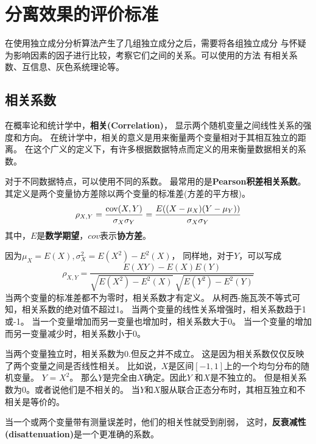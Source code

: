 ﻿%

\chapter{分离效果的评价标准}

\label{chap03}

在使用独立成分分析算法产生了几组独立成分之后，需要将各组独立成分
与怀疑为影响因素的因子进行比较，考察它们之间的关系。可以使用的方法
有相关系数、互信息、灰色系统理论等。
 
\section{相关系数}
在概率论和统计学中，\textbf{相关(Correlation)}，
显示两个随机变量之间线性关系的强度和方向。
在统计学中，相关的意义是用来衡量两个变量相对于其相互独立的距离。
在这个广义的定义下，有许多根据数据特点而定义的用来衡量数据相关的系数。

对于不同数据特点，可以使用不同的系数。
最常用的是\textbf{Pearson积差相关系数}。
其定义是两个变量协方差除以两个变量的标准差(方差的平方根)。
\begin{equation}
\rho_{X,Y} = {\mathrm{cov}(X,Y) \over \sigma_X \sigma_Y} 
           = {E((X-\mu_X)(Y-\mu_Y)) \over \sigma_X\sigma_Y}
\end{equation}
其中，$E$是\textbf{数学期望}，$cov$表示\textbf{协方差}。

因为$\mu_X = E(X), \sigma_X^2 = E(X^2) - E^2(X)$，
同样地，对于$Y$，可以写成
\begin{equation}
\rho_{X,Y} = 
       \frac{E(XY)-E(X)E(Y)}
            {\sqrt{E(X^2)-E^2(X)}~\sqrt{E(Y^2)-E^2(Y)}}
\end{equation}
当两个变量的标准差都不为零时，相关系数才有定义。
从柯西-施瓦茨不等式可知，相关系数的绝对值不超过1。
当两个变量的线性关系增强时，相关系数趋于1或-1。
当一个变量增加而另一变量也增加时，相关系数大于0。
当一个变量的增加而另一变量减少时，相关系数小于0。

当两个变量独立时，相关系数为0.但反之并不成立。 
这是因为相关系数仅仅反映了两个变量之间是否线性相关。
比如说，$X$是区间$[-1, 1]$上的一个均匀分布的随机变量。
$Y$ = $X^2$。 那么$Y$是完全由$X$确定。因此$Y$ 和$X$是不独立的。
但是相关系数为0。或者说他们是不相关的。
当$Y$和$X$服从联合正态分布时，其相互独立和不相关是等价的。

当一个或两个变量带有测量误差时，他们的相关性就受到削弱，
这时，\textbf{反衰减性(disattenuation)}是一个更准确的系数。


